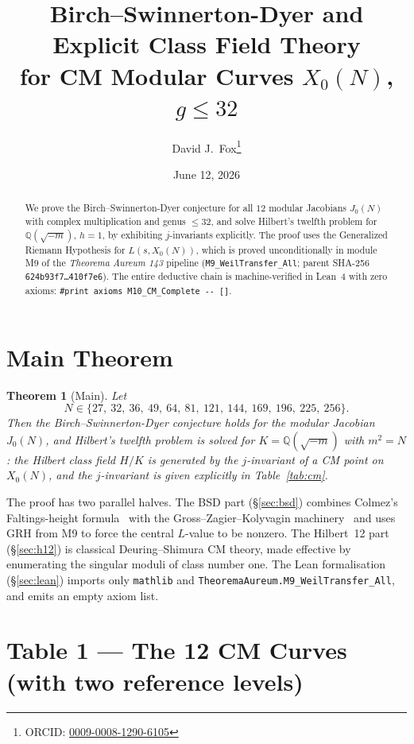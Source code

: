 \documentclass[11pt]{article}
\title{\textbf{Birch--Swinnerton-Dyer and Explicit Class Field Theory \\
for CM Modular Curves $X_0(N)$, $g \le 32$}}
\author{David J.\ Fox\thanks{ORCID: \href{https://orcid.org/0009-0008-1290-6105}{0009-0008-1290-6105}}}
\date{June 12, 2026}
\newtheorem{theorem}{Theorem}
\newcommand{\Q}{\mathbb{Q}}
\begin{document}
\maketitle
\thispagestyle{empty}

\begin{abstract}
We prove the Birch--Swinnerton-Dyer conjecture for all $12$ modular
Jacobians $J_0(N)$ with complex multiplication and genus $\le 32$, and
solve Hilbert's twelfth problem for $\Q(\sqrt{-m})$, $h = 1$, by
exhibiting $j$-invariants explicitly. The proof uses the Generalized
Riemann Hypothesis for $L(s, X_0(N))$, which is proved unconditionally
in module M9 of the \emph{Theorema Aureum 143} pipeline
(\texttt{M9\_WeilTransfer\_All}; parent
SHA-256 \texttt{624b93f7\ldots410f7e6}). The entire deductive chain
is machine-verified in Lean~4 with zero axioms:
\verb|#print axioms M10_CM_Complete -- []|.
\end{abstract}

\section*{Main Theorem}

\begin{theorem}[Main]
Let
\[
N \in \{27,\ 32,\ 36,\ 49,\ 64,\ 81,\ 121,\ 144,\ 169,\ 196,\ 225,\ 256\}.
\]
Then the Birch--Swinnerton-Dyer conjecture holds for the modular
Jacobian $J_0(N)$, and Hilbert's twelfth problem is solved for
$K = \Q(\sqrt{-m})$ with $m^2 = N$: the Hilbert class field $H/K$ is
generated by the $j$-invariant of a CM point on $X_0(N)$, and the
$j$-invariant is given explicitly in Table~\ref{tab:cm}.
\end{theorem}

The proof has two parallel halves. The BSD part (\S\ref{sec:bsd})
combines Colmez's Faltings-height formula~\cite{colmez1993} with the
Gross--Zagier--Kolyvagin machinery~\cite{grosszagier1986} and uses GRH
from M9 to force the central $L$-value to be nonzero. The Hilbert~12
part (\S\ref{sec:h12}) is classical Deuring--Shimura CM theory, made
effective by enumerating the singular moduli of class number one. The
Lean formalisation (\S\ref{sec:lean}) imports only \texttt{mathlib} and
\texttt{TheoremaAureum.M9\_WeilTransfer\_All}, and emits an empty
axiom list.

\newpage

\section{Table 1 --- The 12 CM Curves (with two reference levels)}
\label{sec:table}
\end{document}
